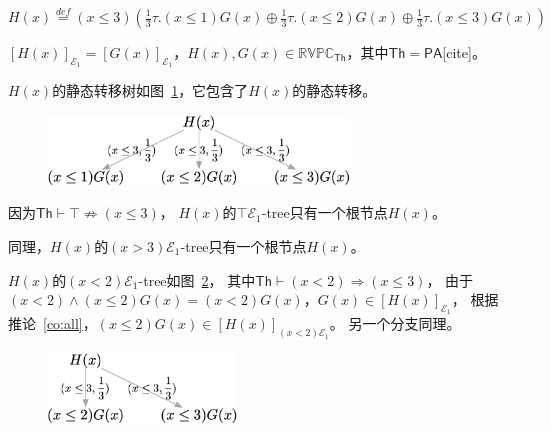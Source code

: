 \begin{example}
   $H(x)\stackrel{def}{=}(x\leq 3)(\frac{1}{3}\tau.(x\leq 1)G(x)\oplus\frac{1}{3}\tau.(x\leq 2)G(x)\oplus\frac{1}{3}\tau.(x\leq 3)G(x))$

   $[H(x)]_{\mathcal{E}_1} = [G(x)]_{\mathcal{E}_1}$，$H(x),G(x)\in \mathbb{RVPC}_{\mathsf{Th}}$，其中$\mathsf{Th}=\mathsf{PA}$[cite]。

   $H(x)$的静态转移树如图~\ref{fig_eg0_1}，它包含了$H(x)$的静态转移。
   \begin{figure}[!htbp]
      \small
      \centering
      \includegraphics[width=8cm]{../figure/example0_1.png}
      \caption[]{}
      \label{fig_eg0_1}
   \end{figure}

   因为$\mathsf{Th}\vdash \top \not\Rightarrow (x\leq 3)$，
   $H(x)$的$\top\mathcal{E}_1$-tree只有一个根节点$H(x)$。

   同理，$H(x)$的$(x>3)\mathcal{E}_1$-tree只有一个根节点$H(x)$。

   $H(x)$的$(x<2)\mathcal{E}_1$-tree如图~\ref{fig_eg0_2}，
   其中$\mathsf{Th}\vdash (x<2)\Rightarrow (x\leq 3)$，
   由于$(x<2)\wedge(x\leq 2)G(x) = (x<2)G(x)$，$G(x)\in[H(x)]_{\mathcal{E}_1}$，
   根据推论~\ref{co:all}，$(x\leq 2)G(x)\in [H(x)]_{(x<2)\mathcal{E}_1}$。
   另一个分支同理。
   \begin{figure}[!htbp]
      \small
      \centering
      \includegraphics[width=5cm]{../figure/example0_2.png}
      \caption[]{}
       \label{fig_eg0_2}
   \end{figure}
\end{example}
